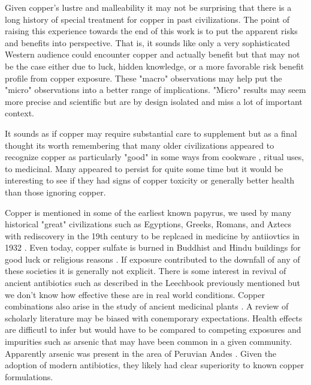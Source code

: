 

Given copper's lustre and malleability it may not be surprising
that there is a long history of special treatment for copper in
past civilizations. The point of raising this experience
towards the end of this work is to put the apparent risks
and benefits into perspective. That is, it sounds like
only a very sophisticated Western audience could encounter copper
and actually benefit but that may not be the case either due to
luck, hidden knowledge, or a  more favorable risk benefit profile
from copper exposure. These "macro" observations may help put the
"micro" observations into a better range of implications. "Micro"
results may seem more precise and scientific but are by design
isolated and miss a lot of important context.

It sounds as if copper may require substantial care to supplement
but as a final thought its worth remembering that many older civilizations
appeared to recognize copper as particularly "good" in some ways
from cookware
\cite{Bansal_Zaina_Parihar_REVIEW_HEALTH_IMPACT_2020},
ritual uses, to medicinal\cite{Sugunthan_Shailaja_Parthasarathy_review_usage_2022}. Many appeared to persist for quite some
time but it would be interesting to see if they had signs of copper
toxicity or generally better health than those ignoring copper.

Copper is mentioned in some of the earliest known papyrus,
we used by many historical "great" civilizations such as Egyptions, Greeks,
Romans, and Aztecs with rediscovery in the 19th century to
be replcaed in medicine by antiiovtics in 1932
\cite{Grass_Rensing_Solioz_Metallic_Copper_2011}.
Even today, copper sulfate is burned in Buddhist and Hindu buildings for
good luck or religious reasons
\cite{Gamakaranage_Rodrigo_Weerasinghe_Complications_management_2011}.
If exposure contributed to the downfall of any of these
societies it is generally not explicit. 
There is some interest in revival of ancient 
antibiotics such as described in the  Leechbook
\cite{DiazGuerrero_CastilloJuarez_Zurabian_Reviving_Past_2024}
  previously mentioned but we don't know how effective these
are in real world conditions.
Copper combinations also arise in the study of ancient medicinal
plants
\cite{Blakeney_TeixidorToneu_Kjesrud_Finding_Medieval_Medicine_Through_2025}
.
A review of scholarly literature may be biased with conemporary
expectations. 
Health effects are difficutl to infer  but would have to be 
compared to competing exposures and impurities such as 
arsenic that may have been common in a given community.
Apparently arsenic was present in the area of Peruvian Andes
\cite{Lechtman_Klein_Production_Copper_1999}.
Given the adoption of modern antibiotics, they likely had clear
superiority to known copper formulations. 


